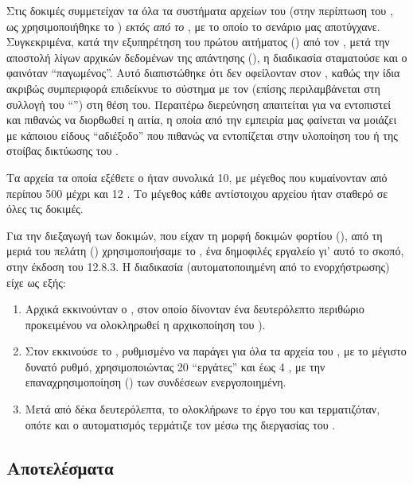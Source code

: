 Στις δοκιμές συμμετείχαν τα όλα τα συστήματα αρχείων του \osv{} (στην περίπτωση
του \viofs{}, ως  χρησιμοποιήθηκε το )
\emph{εκτός από το }, με το οποίο το σενάριο μας αποτύγχανε.
Συγκεκριμένα, κατά την εξυπηρέτηση του πρώτου αιτήματος () από τον
, μετά την αποστολή λίγων αρχικών δεδομένων της απάντησης
(), η διαδικασία σταματούσε και ο \guest{} φαινόταν ``παγωμένος''.
Αυτό διαπιστώθηκε ότι δεν οφείλονταν στον , καθώς την ίδια ακριβώς
συμπεριφορά επιδείκνυε το σύστημα με τον  (επίσης περιλαμβάνεται
στη συλλογή του ``'') στη θέση του. Περαιτέρω διερεύνηση απαιτείται
για να εντοπιστεί και πιθανώς να διορθωθεί η αιτία, η οποία από την εμπειρία μας
φαίνεται να μοιάζει με κάποιου είδους ``αδιέξοδο'' που πιθανώς να εντοπίζεται
στην υλοποίηση του  ή της στοίβας δικτύωσης του \osv{}.

Τα αρχεία τα οποία εξέθετε ο  ήταν συνολικά 10, με μέγεθος που
κυμαίνονταν από περίπου 500  μέχρι και 12 . Το μέγεθος κάθε
αντίστοιχου αρχείου ήταν σταθερό σε όλες τις δοκιμές.

Για την διεξαγωγή των δοκιμών, που είχαν τη μορφή δοκιμών φορτίου 
(), από τη μεριά του πελάτη ()
χρησιμοποιήσαμε το  \cite{vegeta}, ένα δημοφιλές εργαλείο γι' αυτό το
σκοπό, στην έκδοση του 12.8.3. Η διαδικασία (αυτοματοποιημένη από το 
ενορχήστρωσης) είχε ως εξής:
\begin{enumerate}
    \item Αρχικά εκκινούνταν ο \osv{} \guest{}, στον οποίο δίνονταν ένα
          δευτερόλεπτο περιθώριο προκειμένου να ολοκληρωθεί η αρχικοποίηση του
          ).
    \item Στον \host{} εκκινούσε το , ρυθμισμένο να παράγει  για όλα τα αρχεία του , με το μέγιστο
          δυνατό ρυθμό, χρησιμοποιώντας 20 ``εργάτες'' και έως 4 , με
          την επαναχρησιμοποίηση () των συνδέσεων 
          ενεργοποιημένη.
    \item Μετά από δέκα δευτερόλεπτα, το  ολοκλήρωνε το έργο του και
          τερματιζόταν, οπότε και ο αυτοματισμός τερμάτιζε τον \guest{} μέσω
          της διεργασίας του \qemu{}.
\end{enumerate}

\subsection{Αποτελέσματα}

